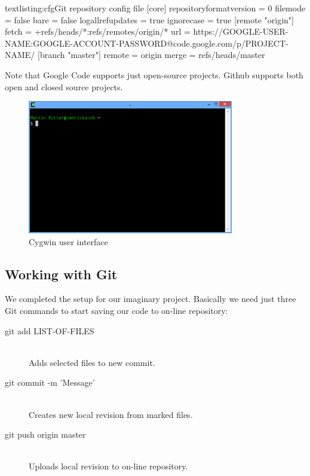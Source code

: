 \begin{fdoccode}{text}{listing:cfg}{Git repository config file}
[core]
	repositoryformatversion = 0
	filemode = false
	bare = false
	logallrefupdates = true
	ignorecase = true
[remote "origin"]
	fetch = +refs/heads/*:refs/remotes/origin/*
	url = https://GOOGLE-USER-NAME:GOOGLE-ACCOUNT-PASSWORD@code.google.com/p/PROJECT-NAME/
[branch "master"]
	remote = origin
	merge = refs/heads/master
\end{fdoccode}

\begin{fdocextra}
Note that Google Code supports just open-source projects. Github supports both open and closed source projects.
\end{fdocextra}

\begin{figure}[ht]
\begin{center}
\includegraphics[width=9cm]{graphics/real-world/04-cygwin.png}
\caption{Cygwin user interface}\label{figure:cig}
\end{center}
\end{figure}

\subsection{Working with Git}
We completed the setup for our imaginary project. Basically we need just three Git commands to start saving our code to on-line repository:
\begin{description}
\item[git add LIST-OF-FILES] \hfill \\
Adds selected files to new commit.
\item[git commit -m 'Message'] \hfill \\
Creates new local revision from marked files.
\item[git push origin master] \hfill \\
Uploads local revision to on-line repository.
\end{description}

